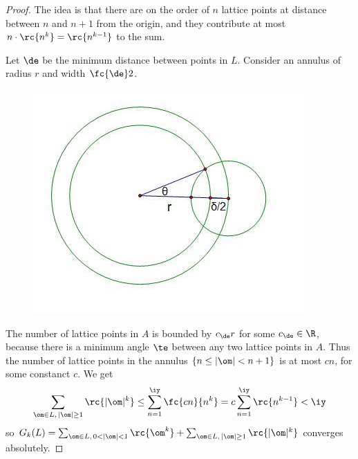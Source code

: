 \begin{proof}
The idea is that there are on the order of $n$ lattice points at distance between $n$ and $n+1$ from the origin, and they contribute at most $n\cdot \rc{n^k}=\rc{n^{k-1}}$ to the sum.

Let $\de$ be the minimum distance between points in $L$. Consider an annulus of radius $r$ and width $\fc{\de}2$.

\begin{figure}[h!] %
\centering
\includegraphics[scale=0.75]{ag-chapters/annulus2}\\
\end{figure}
The number of lattice points in $A$ is bounded by $c_{\de}r$ for some $c_{\de}\in \R$, because there is a minimum angle $\te$ between any two lattice points in $A$. Thus the number of lattice points in the annulus $\{ n\le |\om|<n+1\}$ is at most $cn$, for some constanct $c$. %
We get
\[
\sum_{\om\in L,\,|\om|\ge 1} \rc{|\om|^k}
\le
\sum_{n=1}^{\iy}
\fc{cn}{n^k}
=
c
\sum_{n=1}^{\iy}
\rc{n^{k-1}}
<\iy
\]
so $G_k(L)=\sum_{\om\in L,\,0<|\om|<1} \rc{\om^k}+\sum_{\om\in L,\,|\om|\ge 1} \rc{|\om|^k}$ converges absolutely.
\end{proof}
